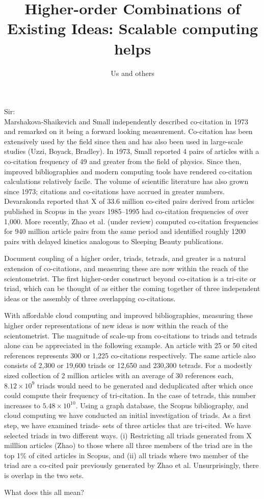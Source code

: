 \documentclass[notitlepage]{report}
\title{Higher-order Combinations of Existing Ideas: Scalable computing helps}
\author{Us and others}
\date{}
\begin{document}
\maketitle
\thispagestyle{empty}
Sir:\\

Marshakova-Shaikevich and Small independently described co-citation in 1973 and remarked on it being a forward looking measurement. Co-citation has been extensively used by the field since then and has also been used in large-scale studies (Uzzi, Boyack, Bradley). In 1973, Small reported 4 pairs of articles with a co-citation frequency of 49 and greater from the field of physics. Since then, improved bibliographies and modern computing tools have rendered co-citation calculations relatively facile. The volume of scientific literature has also grown since 1973; citations and co-citations have accrued in greater numbers. Devarakonda reported that X of 33.6 million co-cited pairs derived from articles published in Scopus in the years 1985--1995 had co-citation frequencies of over 1,000. More recently, Zhao et al. (under review) computed co-citation frequencies for 940 million article pairs from the same period and identified roughly 1200 pairs with delayed kinetics analogous to Sleeping Beauty publications. 

Document coupling of a higher order, triads, tetrads, and greater is a natural extension of  co-citations, and measuring these are now within the reach of the scientometrist. The first  higher-order construct beyond co-citation is a tri-cite or triad, which can be thought of as either the coming together of three independent ideas or the assembly of three overlapping co-citations. 

With affordable cloud computing and improved bibliographies, measuring these higher order representations of new ideas is now within the reach of the scientometrist. The magnitude of scale-up from co-citations to triads and tetrads alone can be appreciated in the following example. An article with 25 or 50 cited references represents 300 or 1,225 co-citations respectively. The same article also consists of  2,300 or 19,600 triads or 12,650 and  230,300 tetrads. For a modestly sized collection of 2 million articles with an average of 30 references each, $8.12 \times10^9$ triads would need to be generated and deduplicated after which once could compute their frequency of tri-citation. In the case of tetrads, this number increases to $5.48 \times 10^{10}$. 
Using a graph database, the Scopus bibliography, and cloud computing we have conducted an initial investigation of triads.
As a first step, we have examined triads- sets of three articles that are tri-cited. We  have selected triads in two different ways. (i) Restricting all triads generated from X milllion articles (Zhao) to those where all three members of the triad are in the top 1\% of cited articles in Scopus, and (ii) all triads where two member of the triad are a co-cited pair previously generated by Zhao et al. Unsurprisingly, there is overlap in the two sets. 

What does this all mean? 
\end{document}
